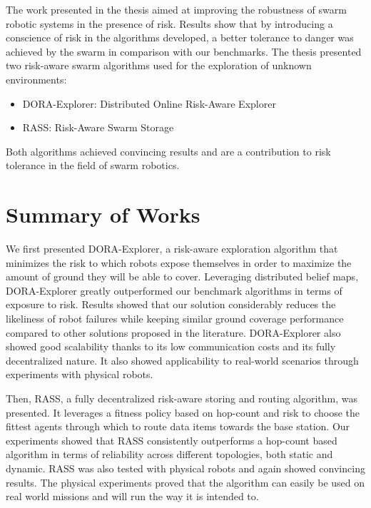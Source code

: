 \label{sec:Conclusion}
The work presented in the thesis aimed at improving the robustness of swarm robotic systems in the presence of risk. Results show that by introducing a conscience of risk in the algorithms developed, a better tolerance to danger was achieved by the swarm in comparison with our benchmarks. The thesis presented two risk-aware swarm algorithms used for the exploration of unknown environments:

\begin{itemize}
    \item DORA-Explorer: Distributed Online Risk-Aware Explorer
    \item RASS: Risk-Aware Swarm Storage
\end{itemize}

Both algorithms achieved convincing results and are a contribution to risk tolerance in the field of swarm robotics. 

\section{Summary of Works}
We first presented DORA-Explorer, a risk-aware exploration
algorithm that minimizes the risk to which robots expose themselves in
order to maximize the amount of ground they will be able to cover. Leveraging distributed belief maps, DORA-Explorer greatly outperformed our benchmark algorithms in terms of exposure to risk. Results showed that our solution considerably reduces the likeliness of robot failures while keeping similar ground coverage performance compared to other solutions proposed in
the literature. DORA-Explorer also showed good scalability thanks to its low
communication costs and its fully decentralized nature. It also showed applicability to real-world scenarios through experiments with physical robots. 

Then, RASS, a fully decentralized risk-aware storing and routing algorithm, was presented. It leverages a fitness policy based on hop-count and risk to choose the fittest agents through which to route data items towards the base station. Our experiments showed that RASS consistently outperforms a hop-count based algorithm in terms of reliability across different topologies, both static and dynamic. RASS was also tested with physical robots and again showed convincing results. The physical experiments proved that the algorithm can easily be used on real world missions and will run the way it is intended to.

